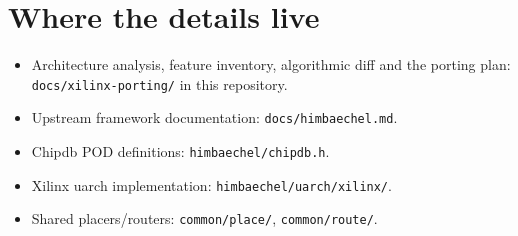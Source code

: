 \documentclass[11pt,a4paper]{article}
\begin{document}
\section{Where the details live}

\begin{itemize}
\item Architecture analysis, feature inventory, algorithmic diff and the
  porting plan: \texttt{docs/\allowbreak xilinx-porting/} in this repository.
\item Upstream framework documentation: \texttt{docs/himbaechel.md}.
\item Chipdb POD definitions: \texttt{himbaechel/chipdb.h}.
\item Xilinx uarch implementation: \texttt{himbaechel/uarch/xilinx/}.
\item Shared placers/routers: \texttt{common/place/},
  \texttt{common/route/}.
\end{itemize}
\end{document}
